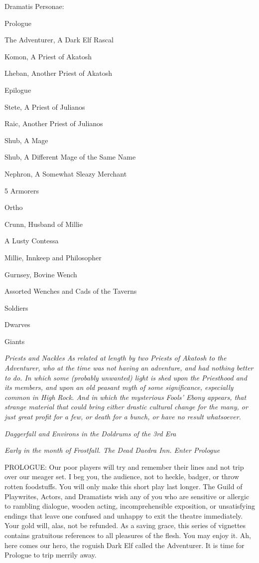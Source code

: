 
Dramatis Personae:
\small
\begin{description}
\item Prologue
\item The Adventurer, A Dark Elf Rascal
\item Komon, A Priest of Akatosh
\item Lheban, Another Priest of Akatosh
\item Epilogue
\item Stete, A Priest of Julianos
\item Raic, Another Priest of Julianos
\item Shub, A Mage
\item Shub, A Different Mage of the Same Name
\item Nephron, A Somewhat Sleazy Merchant
\item 5 Armorers
\item Ortho
\item Crunn, Husband of Millie
\item A Lusty Contessa
\item Millie, Innkeep and Philosopher
\item Gurnsey, Bovine Wench
\item Assorted Wenches and Cads of the Taverns
\item Soldiers
\item Dwarves
\item Giants
\end{description}


 \textit{Priests and Nackles As related at length by two Priests of Akatosh to the Adventurer, who at the time was not having an adventure, and had nothing better to do. In which some (probably unwanted) light is shed upon the Priesthood and its members, and upon an old peasant myth of some significance, especially common in High Rock. And in which the mysterious Fools' Ebony appears, that strange material that could bring either drastic cultural change for the many, or just great profit for a few, or death for a bunch, or have no result whatsoever.}

\textit{Daggerfall and Environs in the Doldrums of the 3rd Era}

\textit{Early in the month of Frostfall. The Dead Daedra Inn. Enter Prologue}

PROLOGUE: Our poor players will try and remember their lines and not trip over our meager set. I beg you, the audience, not to heckle, badger, or throw rotten foodstuffs. You will only make this short play last longer. The Guild of Playwrites, Actors, and Dramatists wish any of you who are sensitive or allergic to rambling dialogue, wooden acting, incomprehensible exposition, or unsatisfying endings that leave one confused and unhappy to exit the theatre immediately. Your gold will, alas, not be refunded. As a saving grace, this series of vignettes contains gratuitous references to all pleasures of the flesh. You may enjoy it. Ah, here comes our hero, the roguish Dark Elf called the Adventurer. It is time for Prologue to trip merrily away.

